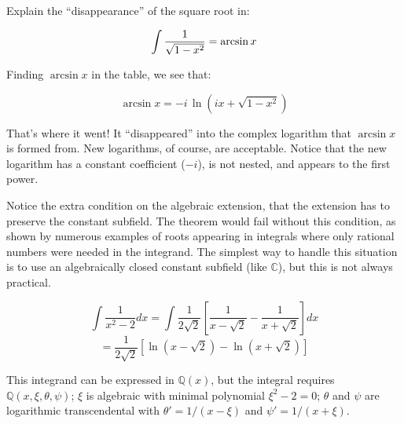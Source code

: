 \endtheorem

\example

Explain the ``disappearance'' of the square root in:

$$\int{1\over\sqrt{1-x^2}} = \arcsin x$$

Finding $\arcsin x$ in the table, we see that:

$$\arcsin x = -i \,\ln (ix + \sqrt{1-x^2})$$

That's where it went!  It ``disappeared'' into the complex logarithm
that $\arcsin x$ is formed from.  New logarithms, of course, are
acceptable.  Notice that the new logarithm has a constant coefficient
($-i$), is not nested, and appears to the first power.

\endexample

Notice the extra condition on the algebraic extension, that the
extension has to preserve the constant subfield.  The theorem would
fail without this condition, as shown by numerous examples of roots
appearing in integrals where only rational numbers were needed in the
integrand.  The simplest way to handle this situation is to use an
algebraically closed constant subfield (like ${\mathbb C}$), but
this is not always practical.

\example

$$\int \frac{1}{x^2-2} dx = \int \frac{1}{2\sqrt{2}} \left[ \frac{1}{x-\sqrt{2}} - \frac{1}{x+\sqrt{2}} \right] dx$$
$$= \frac{1}{2\sqrt{2}} \left[ \ln(x-\sqrt{2}) - \ln(x+\sqrt{2}) \right]$$

This integrand can be expressed in ${\mathbb Q}(x)$, but the integral
requires ${\mathbb Q}(x,\xi,\theta,\psi)$; $\xi$ is algebraic
with minimal polynomial $\xi^2-2=0$; $\theta$ and $\psi$ are
logarithmic transcendental with $\theta' = 1/(x-\xi)$
and $\psi' = 1/(x+\xi)$.

\endexample
